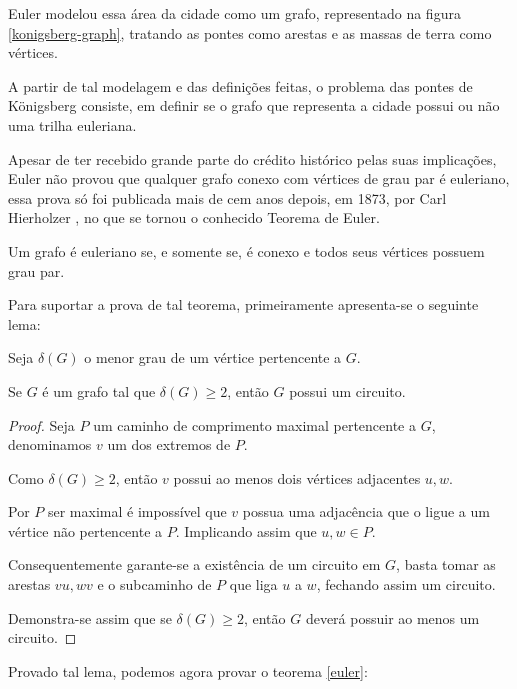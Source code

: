 Euler modelou essa área da cidade como um grafo, representado na figura \ref{konigsberg-graph}, tratando as pontes como arestas e as massas de terra como vértices.

A partir de tal modelagem e das definições feitas, o problema das pontes de Königsberg consiste, em definir se o grafo que representa a cidade possui ou não uma trilha euleriana. 

Apesar de ter recebido grande parte do crédito histórico pelas suas implicações, Euler não provou que qualquer grafo conexo com vértices de grau par é euleriano, essa prova só foi publicada mais de cem anos depois, em 1873, por Carl Hierholzer \cite{hierholzer}, no que se tornou o conhecido Teorema de Euler.


\begin{theorem}
    Um grafo é euleriano se, e somente se, é conexo e todos seus vértices possuem grau par.
    \label{euler}
\end{theorem}

Para suportar a prova de tal teorema, primeiramente apresenta-se o seguinte lema:

Seja $\delta(G)$ o menor grau de um vértice pertencente a $G$.

\begin{lemma}
	Se $G$ é um grafo tal que $\delta(G) \geq 2$, então $G$ possui um circuito.
	\label{lema}
\end{lemma}

\begin{proof}
	Seja $P$ um caminho de comprimento maximal pertencente a $G$, denominamos $v$ um dos extremos de $P$. 

    Como $\delta(G) \geq 2$, então $v$ possui ao menos dois vértices adjacentes $u, w$.

	Por $P$ ser maximal é impossível que $v$ possua uma adjacência que o ligue a um vértice não pertencente a $P$.
    Implicando assim que $u, w \in P$.
	
    Consequentemente garante-se a existência de um circuito em $G$, basta tomar as arestas $vu, wv$ e o subcaminho de $P$ que liga $u$ a $w$, fechando assim um circuito.

	Demonstra-se assim que se $\delta(G) \geq 2$, então $G$ deverá possuir ao menos um circuito.
\end{proof}

Provado tal lema, podemos agora provar o teorema \ref{euler}:

